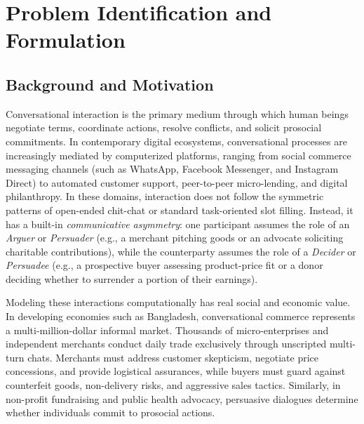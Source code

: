 \chapter{Problem Identification and Formulation}
\label{ch:problem}

\section{Background and Motivation}
\label{sec:background}

Conversational interaction is the primary medium through which human beings negotiate terms, coordinate actions, resolve conflicts, and solicit prosocial commitments. In contemporary digital ecosystems, conversational processes are increasingly mediated by computerized platforms, ranging from social commerce messaging channels (such as WhatsApp, Facebook Messenger, and Instagram Direct) to automated customer support, peer-to-peer micro-lending, and digital philanthropy. In these domains, interaction does not follow the symmetric patterns of open-ended chit-chat or standard task-oriented slot filling. Instead, it has a built-in \textit{communicative asymmetry}: one participant assumes the role of an \textit{Arguer} or \textit{Persuader} (e.g., a merchant pitching goods or an advocate soliciting charitable contributions), while the counterparty assumes the role of a \textit{Decider} or \textit{Persuadee} (e.g., a prospective buyer assessing product-price fit or a donor deciding whether to surrender a portion of their earnings).

Modeling these interactions computationally has real social and economic value. In developing economies such as Bangladesh, conversational commerce represents a multi-million-dollar informal market. Thousands of micro-enterprises and independent merchants conduct daily trade exclusively through unscripted multi-turn chats. Merchants must address customer skepticism, negotiate price concessions, and provide logistical assurances, while buyers must guard against counterfeit goods, non-delivery risks, and aggressive sales tactics. Similarly, in non-profit fundraising and public health advocacy, persuasive dialogues determine whether individuals commit to prosocial actions. 

